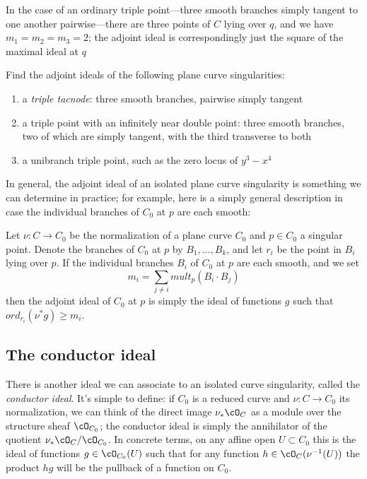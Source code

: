 \begin{example}
In the case of an ordinary triple point---three smooth branches simply tangent to one another pairwise---there are three points of $C$ lying over $q$, and we have $m_1=m_2=m_3= 2$; the adjoint ideal is correspondingly just the square of the maximal ideal at $q$
\end{example}

\begin{exercise}
Find the adjoint ideals of the following plane curve singularities:
\begin{enumerate}
\item a \emph{triple tacnode}: three smooth branches, pairwise simply tangent
\item a triple point with an infinitely near double point: three smooth branches, two of which are simply tangent, with the third transverse to both
\item a unibranch triple point, such as the zero locus of $y^3-x^4$
\end{enumerate}
\end{exercise}

In general, the adjoint ideal of an isolated plane curve singularity is something we can determine in practice; for example, here is a simply general description in case the individual branches of $C_0$ at $p$ are each smooth:

\begin{proposition}
Let $\nu : C \to C_0$ be the normalization of a plane curve $C_0$ and $p \in C_0$ a singular point. Denote the branches of $C_0$ at $p$ by $B_1,\dots,B_k$, and let $r_i$ be the point in $B_i$ lying over $p$. If the individual branches $B_i$ of $C_0$ at $p$ are each smooth, and we set
$$
m_i = \sum_{j \neq i} mult_p(B_i \cdot B_j)
$$
then the adjoint ideal of $C_0$ at $p$ is simply the ideal of functions $g$ such that $ord_{r_i}(\nu^*g) \geq m_i$.
\end{proposition}

\subsection{The conductor ideal}

There is another ideal we can associate to an isolated curve singularity, called the \emph{conductor ideal}. It's simple to define: if $C_0$ is a reduced curve and $\nu : C \to C_0$ its normalization, we can think of the direct image $\nu_*\cO_C$ as a module over the structure sheaf $\cO_{C_0}$; the conductor ideal is simply the annihilator of the quotient $\nu_*\cO_C/\cO_{C_0}$. In concrete terms, on any affine open $U \subset C_0$ this is the ideal of functions $g \in \cO_{C_0}(U)$ such that for any function $h \in \cO_C(\nu^{-1}(U))$ the product $hg$ will be the pullback of a function on $C_0$.

